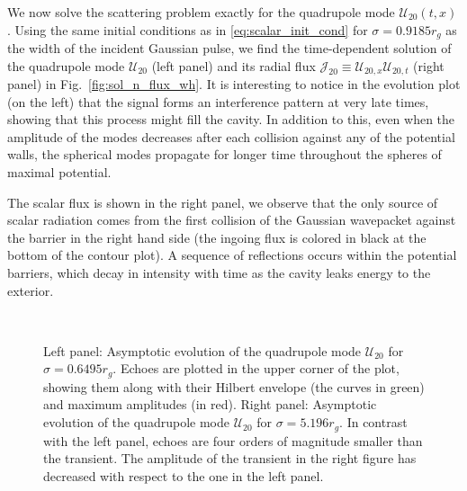\documentclass[article,aps,nofootinbib,twocolumn,superscriptaddress]{revtex4-1}
\begin{document}
We now solve the scattering problem exactly for the quadrupole mode $\mathcal{U}_{20}(t,x)$. Using the same initial conditions as in \eqref{eq:scalar_init_cond} for $\sigma=0.9185r_g$ as the width of the incident Gaussian pulse, we find the time-dependent solution of the quadrupole mode $\mathcal{U}_{20}$ (left panel) and its radial flux $\mathcal{J}_{20}\equiv \mathcal{U}_{20,x} \mathcal{U}_{20,t}$ (right panel) in Fig.~\ref{fig:sol_n_flux_wh}. It is interesting to notice in the evolution plot (on the left) that the signal forms an interference pattern at very late times, showing that this process might fill the cavity. In addition to this, even when the amplitude of the modes decreases after each collision against any of the potential walls, the spherical modes propagate for longer time throughout the spheres of maximal potential. 

The scalar flux is shown in the right panel, we observe that the only source of scalar radiation comes from the first collision of the Gaussian wavepacket against the barrier in the right hand side (the ingoing flux is colored in black at the bottom of the contour plot). A sequence of reflections occurs within the potential barriers, which decay in intensity with time as the cavity leaks energy to the exterior.

\begin{figure}
\centering
{} \,
\caption{\label{fig:asympt_two_sigmas} Left panel: Asymptotic evolution of the quadrupole mode $\mathcal{U}_{20}$ for $\sigma=0.6495r_g$. Echoes are plotted in the upper corner of the plot, showing them along with their Hilbert envelope (the curves in green) and maximum amplitudes (in red). Right panel: Asymptotic evolution of the quadrupole mode $\mathcal{U}_{20}$ for $\sigma=5.196r_g$. In contrast with the left panel, echoes are four orders of magnitude smaller than the transient. The amplitude of the transient in the right figure has decreased with respect to the one in the left panel.} 
\end{figure}
\end{document}

